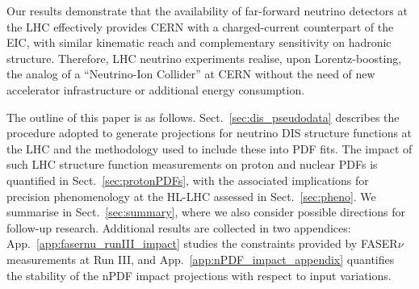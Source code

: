 Our results demonstrate that the availability of far-forward neutrino detectors
at the LHC effectively
provides CERN with a charged-current counterpart of the EIC,
with similar kinematic reach and complementary sensitivity on hadronic
structure.
%
Therefore, LHC neutrino experiments realise, upon Lorentz-boosting, the analog of
a ``Neutrino-Ion Collider'' at CERN
without the need of new accelerator infrastructure or additional energy consumption.

The outline of this paper is as follows.
%
Sect.~\ref{sec:dis_pseudodata} describes the procedure
adopted to generate projections for neutrino DIS structure functions at the LHC
and the methodology used to include these into PDF fits.
%
The impact of such LHC structure function measurements on proton and nuclear
PDFs is quantified in Sect.~\ref{sec:protonPDFs}, with the
associated implications for precision phenomenology
at the HL-LHC assessed in Sect.~\ref{sec:pheno}.
%
We summarise in Sect.~\ref{sec:summary}, where we also consider possible
directions for follow-up research.
%
Additional results are collected in two appendices:
App.~\ref{app:fasernu_runIII_impact} studies the constraints provided by
FASER$\nu$ measurements at Run III, and App.~\ref{app:nPDF_impact_appendix}
quantifies the stability of the nPDF impact projections with respect
to input variations.



